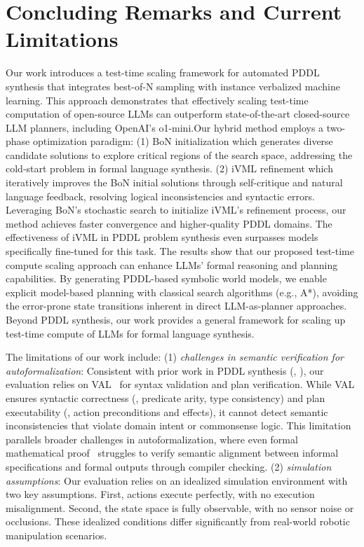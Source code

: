 \section{Concluding Remarks and Current Limitations}
\vspace{1mm}


Our work introduces a test-time scaling framework for automated PDDL synthesis that integrates best-of-N sampling with instance verbalized machine learning. This approach demonstrates that effectively scaling test-time computation of open-source LLMs can outperform state-of-the-art closed-source LLM planners, including OpenAI's o1-mini.Our hybrid method employs a two-phase optimization paradigm:
(1) BoN initialization which generates diverse candidate solutions to explore critical regions of the search space, addressing the cold-start problem in formal language synthesis.
(2) iVML refinement which iteratively improves the BoN initial solutions through self-critique and natural language feedback, resolving logical inconsistencies and syntactic errors.
Leveraging BoN's stochastic search to initialize iVML's refinement process, our method achieves faster convergence and higher-quality PDDL domains.
The effectiveness of iVML in PDDL problem synthesis even surpasses models specifically fine-tuned for this task. 
The results show that our proposed test-time compute scaling approach can enhance LLMs' formal reasoning and planning capabilities.
By generating PDDL-based symbolic world models, we enable explicit model-based planning with classical search algorithms (e.g., A*), avoiding the error-prone state transitions inherent in direct LLM-as-planner approaches. 
Beyond PDDL synthesis, our work provides a general framework for scaling up test-time compute of LLMs for formal language synthesis.


The limitations of our work include:
(1) \emph{challenges in semantic verification for autoformalization}:
Consistent with prior work in PDDL synthesis (\eg, \cite{guan2023leveraging, zuo2024planetarium, valmeekam2024planbench}), our evaluation relies on VAL~\cite{howey2003val} for syntax validation and plan verification. While VAL ensures syntactic correctness (\eg, predicate arity, type consistency) and plan executability (\eg, action preconditions and effects), it cannot detect semantic inconsistencies that violate domain intent or commonsense logic. This limitation parallels broader challenges in autoformalization, where even formal mathematical proof~\cite{zheng2021minif2f} struggles to verify semantic alignment between informal specifications and formal outputs through compiler checking.
(2) \emph{simulation assumptions}:
Our evaluation relies on an idealized simulation environment with two key assumptions. First, actions execute perfectly, with no execution misalignment. Second, the state space is fully observable, with no sensor noise or occlusions. These idealized conditions differ significantly from real-world robotic manipulation scenarios.













